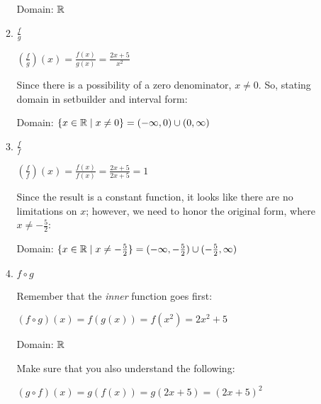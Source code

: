\documentclass[letterpaper,12pt,fleqn]{article}
\begin{document}
\begin{enumerate}
\begin{enumerate}
    Domain: $\mathbb{R}$
    
  \item $\frac{f}{g}$

    $\left(\frac{f}{g}\right)(x)=\frac{f(x)}{g(x)}=\frac{2x+5}{x^2}$

    Since there is a possibility of a zero denominator, $x\ne0$. So, stating
    domain in setbuilder and interval form:

    Domain: $\{x\in\mathbb{R}\mid x\ne0\}=(-\infty,0)\cup(0,\infty)$
    
  \item $\frac{f}{f}$

    $\left(\frac{f}{f}\right)(x)=\frac{f(x)}{f(x)}=\frac{2x+5}{2x+5}=1$

    Since the result is a constant function, it looks like there are no
    limitations on $x$; however, we need to honor the original form, where
    $x\ne-\frac{5}{2}$:
    
    Domain: $\{x\in\mathbb{R}\mid x\ne-\frac{5}{2}\}=
    (-\infty,-\frac{5}{2})\cup(-\frac{5}{2},\infty)$

  \item $f\circ g$

    Remember that the \emph{inner} function goes first:

    $(f\circ g)(x)=f(g(x))=f(x^2)=2x^2+5$

    Domain: $\mathbb{R}$

    Make sure that you also understand the following:
    
    $(g\circ f)(x)=g(f(x))=g(2x+5)=(2x+5)^2$
  \end{enumerate}
\end{enumerate}
\end{document}
